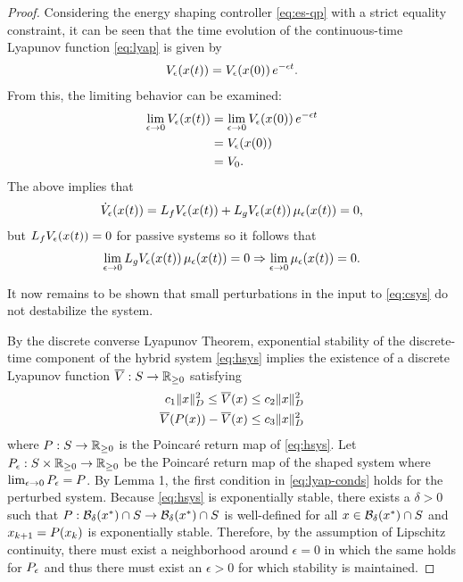 \documentclass[twocolumn]{article}
\begin{document}
\begin{proof}
  Considering the energy shaping controller \eqref{eq:es-qp} with a strict equality constraint, it can be seen that the time evolution of the continuous-time Lyapunov function \eqref{eq:lyap} is given by
  \begin{align*}
    \Ve(x(t)) = \Ve(x(0)) \, e^{-\epsilon t}.
  \end{align*}
  From this, the limiting behavior can be examined:
  \begin{align*}
    \limeps \Ve(x(t)) &= \limeps \Ve(x(0)) \, e^{-\epsilon t}\\
    &= \Ve(x(0))\\
    &= V_0.
  \end{align*}
  The above implies that
  \begin{align*}
    \dVe(x(t)) = L_{f} \Ve(x(t)) + L_{g} \Ve(x(t)) \, \mu_{\epsilon}(x(t)) = 0,
  \end{align*}
  but $L_{f} \Ve(x(t)) = 0$ for passive systems so it follows that
  \begin{align*}
    \limeps L_{g} \Ve(x(t)) \, \mu_{\epsilon}(x(t)) = 0 \Rightarrow \limeps \mu_{\epsilon}(x(t)) = 0.
  \end{align*}

  It now remains to be shown that small perturbations in the input to \eqref{eq:csys} do not destabilize the system.

  By the discrete converse Lyapunov Theorem, exponential stability of the discrete-time component of the hybrid system \eqref{eq:hsys} implies the existence of a discrete Lyapunov function $\Vbar : \S \to \Rnn$ satisfying
  \begin{align}
    \label{eq:lyap-conds}
    c_{1} \| x \|^{2}_{\D} \leq \Vbar(x) \leq c_{2} \| x \|_{\D}^2\\
    \nonumber
    \Vbar(\P(x)) - \Vbar(x) \leq c_{3} \| x \|^{2}_{\D}
  \end{align}
where $\P : S \to \Rnn$ is the Poincar{\'e} return map of \eqref{eq:hsys}.
%
Let $\Pe : \S \times \Rnn \to \Rnn$ be the Poincar{\'e} return map of the shaped system where $\limeps \Pe = \P$.
%
By Lemma 1, the first condition in \eqref{eq:lyap-conds} holds for the perturbed system.
%
Because \eqref{eq:hsys} is exponentially stable, there exists a $\delta > 0$ such that $\P : \B_{\delta}(\xst) \cap \S \to \B_{\delta}(\xst) \cap \S$ is well-defined for all $x \in \B_{\delta}(\xst) \cap \S$ and $x_{k+1} = \P(x_{k})$ is exponentially stable.
%
Therefore, by the assumption of Lipschitz continuity, there must exist a neighborhood around $\epsilon = 0$ in which the same holds for $\Pe$ and thus there must exist an $\epsilon > 0$ for which stability is maintained.
\end{proof}
\end{document}
